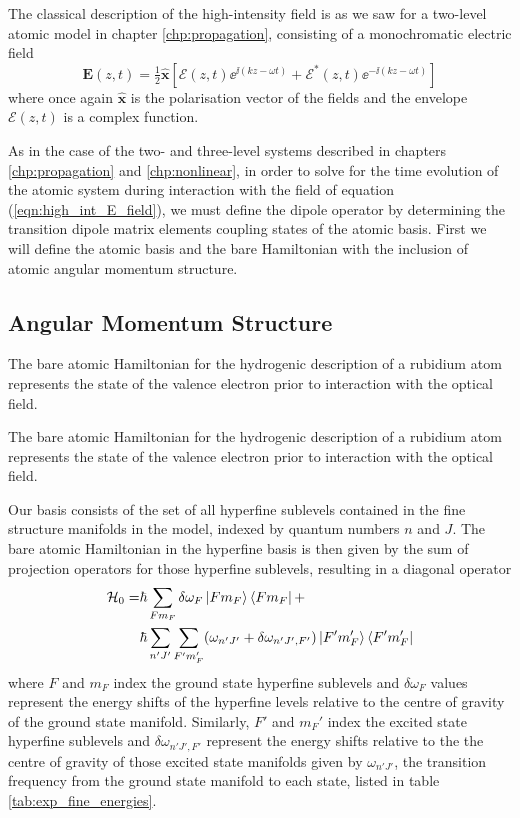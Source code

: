     The classical description of the high-intensity field is as we saw for a
    two-level atomic model in chapter \ref{chp:propagation}, consisting of a monochromatic electric field
    \begin{equation}
      \mathbf{E}(z,t) = \tfrac{1}{2} \mathbf{\hat{x}}  \left[ \mathcal{E}(z,t) 
          \ee^{\ii(k z - \omega t)} + \mathcal{E}^*(z,t) 
          \ee^{-\ii(k z - \omega t)} \right]
      \label{eqn:high_int_E_field}
    \end{equation}
    where once again $\mathbf{\hat{x}}$ is the polarisation vector of the fields
    and the envelope $\mathcal{E}(z,t)$ is a complex function.

    As in the case of the two- and three-level systems described in chapters
    \ref{chp:propagation} and \ref{chp:nonlinear}, in order to solve for the
    time evolution of the atomic system during interaction with the field of
    equation (\ref{eqn:high_int_E_field}), we must define the dipole operator by
    determining the transition dipole matrix elements coupling states of the
    atomic basis. First we will define the atomic basis and the bare Hamiltonian
    with the inclusion of atomic angular momentum structure.

  \subsection{Angular Momentum Structure}  

    The bare atomic Hamiltonian for the hydrogenic description of a rubidium
    atom represents the state of the valence electron prior to interaction with
    the optical field.

    The bare atomic Hamiltonian for the hydrogenic description of a rubidium
    atom represents the state of the valence electron prior to interaction with
    the optical field.

    Our basis consists of the set of all hyperfine sublevels contained in the
    fine structure manifolds in the model, indexed by quantum numbers $n$ and
    $J$. The bare atomic Hamiltonian in the hyperfine basis is then given by the
    sum of projection operators for those hyperfine sublevels, resulting in a
    diagonal operator
    \begin{align}
      \mathcal{H}_0 = &\hbar \sum_{F m_F} \delta \omega_F 
                        \Ket{F m_F} \Bra{F m_F} + \nonumber \\
      &\hbar \sum_{n' J'} \sum_{F' m_F'} (\omega_{n' J'} + 
        \delta \omega_{n' J', F'}) \Ket{F' m'_F} \Bra{F' m'_F}
    \end{align}
    where $F$ and $m_F$ index the ground state hyperfine sublevels and $\delta
    \omega_F$ values represent the energy shifts of the hyperfine levels
    relative to  the centre of gravity of the ground state manifold. Similarly,
    $F'$ and $m_F'$ index the excited state hyperfine sublevels and $\delta
    \omega_{n' J', F'}$ represent the energy shifts relative to the the centre
    of gravity of those excited state manifolds given by $\omega_{n' J'}$, the
    transition frequency from the ground state manifold to each state, listed in
    table \ref{tab:exp_fine_energies}.

